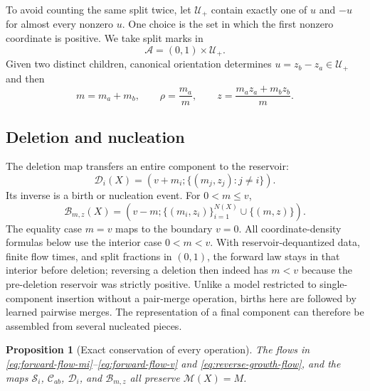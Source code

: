 \documentclass[10pt]{article}
\newtheorem{proposition}[theorem]{Proposition}
\theoremstyle{definition}
\theoremstyle{remark}
\newcommand{\splitmap}{\mathcal{S}}
\newcommand{\mergemap}{\mathcal{C}}
\newcommand{\deathmap}{\mathcal{D}}
\newcommand{\birthmap}{\mathcal{B}}
\begin{document}
To avoid counting the same split twice, let $\mathcal U_+$ contain exactly one of $u$ and $-u$ for almost every nonzero $u$.  One choice is the set in which the first nonzero coordinate is positive.  We take split marks in
\begin{equation}
  \mathcal A=(0,1)\times\mathcal U_+.
\end{equation}
Given two distinct children, canonical orientation determines $u=z_b-z_a\in\mathcal U_+$ and then
\begin{equation}
  m=m_a+m_b,\qquad
  \rho=\frac{m_a}{m},\qquad
  z=\frac{m_a z_a+m_b z_b}{m}.
  \label{eq:inverse-split-coordinates}
\end{equation}

\subsection{Deletion and nucleation}

The deletion map transfers an entire component to the reservoir:
\begin{equation}
  \deathmap_i(X)
  =\left(v+m_i;\{(m_j,z_j):j\neq i\}\right).
  \label{eq:death-map}
\end{equation}
Its inverse is a birth or nucleation event.  For $0<m\leq v$,
\begin{equation}
  \birthmap_{m,z}(X)
  =\left(v-m;\{(m_i,z_i)\}_{i=1}^{N(X)}\cup\{(m,z)\}\right).
  \label{eq:birth-map}
\end{equation}
The equality case $m=v$ maps to the boundary $v=0$.  All coordinate-density
formulas below use the interior case $0<m<v$.  With reservoir-dequantized
data, finite flow times, and split fractions in $(0,1)$, the forward law
stays in that interior before deletion; reversing a deletion then indeed has
$m<v$ because the pre-deletion reservoir was strictly positive.
Unlike a model restricted to single-component insertion without a
pair-merge operation, births here are followed by learned pairwise merges.
The representation of a final component can therefore be assembled from
several nucleated pieces.

\begin{proposition}[Exact conservation of every operation]
\label{prop:event-conservation}
The flows in \eqref{eq:forward-flow-mi}--\eqref{eq:forward-flow-v} and
\eqref{eq:reverse-growth-flow}, and the maps
$\splitmap_i$, $\mergemap_{ab}$, $\deathmap_i$, and $\birthmap_{m,z}$ all preserve $\mathcal M(X)=M$.
\end{proposition}
\end{document}
